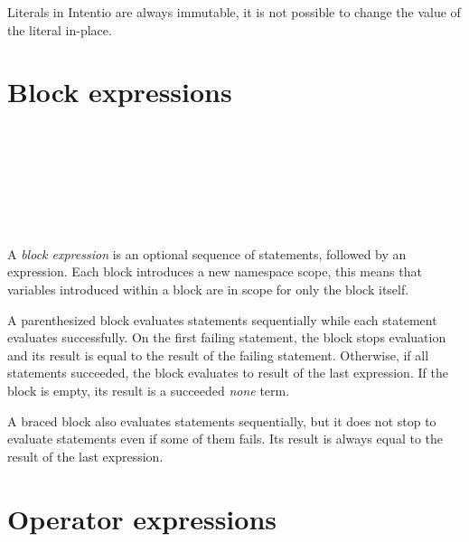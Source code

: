Literals in Intentio are always immutable, it is not possible to change the value of the literal in-place.

\section{Block expressions}

\begin{bnf}
   \eq {} \\
  \\
   \eq \term{\{} \  \ \term{\}} \\
   \eq \term{(} \  \ \term{)} \\
  \\
   \eq {} \  \ \gtry{\term{;}}
\end{bnf}

A \emph{block expression} is an optional sequence of statements, followed by an expression. Each block introduces a new namespace scope, this means that variables introduced within a block are in scope for only the block itself.

A parenthesized block evaluates statements sequentially while each statement evaluates successfully. On the first failing statement, the block stops evaluation and its result is equal to the result of the failing statement. Otherwise, if all statements succeeded, the block evaluates to result of the last expression. If the block is empty, its result is a succeeded \emph{none} term.

A braced block also evaluates statements sequentially, but it does not stop to evaluate statements even if some of them fails. Its result is always equal to the result of the last expression.
\section{Operator expressions}

